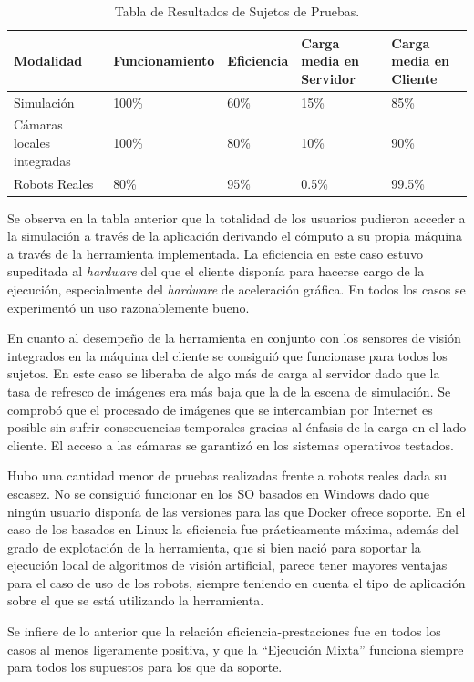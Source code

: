 \begin{table}[htbp]
\begin{center}
\begin{tabular}{| p{1.8cm}| p{2.6cm} | p{1.7cm}| p{2.4cm}| p{3cm}|}
\hline
Modalidad & Funcionamiento & Eficiencia & Carga media en Servidor & Carga media en Cliente \\
\hline \hline
Simulación & 100\% & 60\% & 15\% & 85\%\\ \hline
Cámaras locales integradas & 100\% & 80\% & 10\% & 90\%\\ \hline
Robots Reales & 80\% & 95\% & 0.5\% & 99.5\%\\ \hline
\end{tabular}
\caption{Tabla de Resultados de Sujetos de Pruebas.}
\label{tabla:res_pruebas}
\end{center}
\end{table}

Se observa en la tabla anterior que la totalidad de los usuarios pudieron acceder a la simulación a través de la aplicación derivando el cómputo a su propia máquina a través de la herramienta implementada. La eficiencia en este caso estuvo supeditada al \textit{hardware} del que el cliente disponía para hacerse cargo de la ejecución, especialmente del \textit{hardware} de aceleración gráfica. En todos los casos se experimentó un uso razonablemente bueno.

En cuanto al desempeño de la herramienta en conjunto con los sensores de visión integrados en la máquina del cliente se consiguió que funcionase para todos los sujetos. En este caso se liberaba de algo más de carga al servidor dado que la tasa de refresco de imágenes era más baja que la de la escena de simulación. Se comprobó que el procesado de imágenes que se intercambian por Internet es posible sin sufrir consecuencias temporales gracias al énfasis de la carga en el lado cliente. El acceso a las cámaras se garantizó en los sistemas operativos testados.

Hubo una cantidad menor de pruebas realizadas frente a robots reales dada su escasez. No se consiguió funcionar en los SO basados en Windows dado que ningún usuario disponía de las versiones para las que Docker ofrece soporte. En el caso de los basados en Linux la eficiencia fue prácticamente máxima, además del grado de explotación de la herramienta, que si bien nació para soportar la ejecución local de algoritmos de visión artificial, parece tener mayores ventajas para el caso de uso de los robots, siempre teniendo en cuenta el tipo de aplicación sobre el que se está utilizando la herramienta. 

Se infiere de lo anterior que la relación eficiencia-prestaciones fue en todos los casos al menos ligeramente positiva, y que la ``Ejecución Mixta'' funciona siempre para todos los supuestos para los que da soporte.

